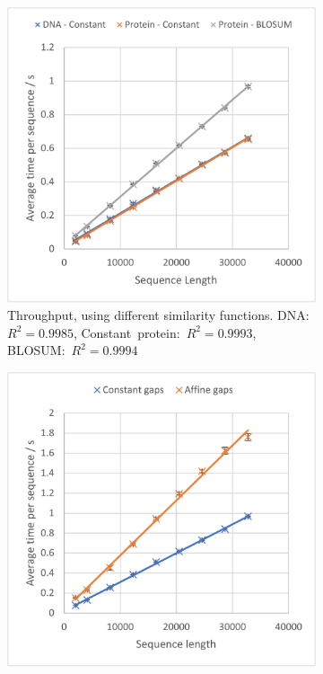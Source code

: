 \begin{figure}
    \centering
    \begin{subfigure}{.49\textwidth}
      \centering
      \includegraphics[width=\linewidth]{figs/eval/cu_similarity_f.pdf}
      \caption{Throughput, using different similarity functions. DNA: $R^2=0.9985$, Constant~protein:~${R^2=0.9993}$, BLOSUM:~${R^2=0.9994}$}
      \label{fig:CU_similarity_fun}
    \end{subfigure}
    \hfill
    \begin{subfigure}{.49\textwidth}
      \centering
      \includegraphics[width=\linewidth]{figs/eval/cu_gotoh.pdf}

\end{subfigure}
\end{figure}
